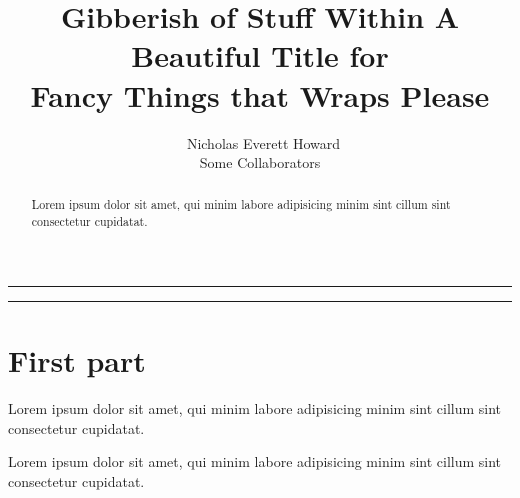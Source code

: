 






\settings
{}

\title{Gibberish of Stuff Within A Beautiful Title for\\
Fancy Things that Wraps Please}
\author{\Large{\ Nicholas Everett Howard}
\smallskip\\
Some Collaborators
}
\date{}
\maketitle

\thispagestyle{titlepage}

\vspace{4mm}
\hrule
\vspace{4mm}
\begin{abstract}
\normalsize
Lorem ipsum dolor sit amet, qui minim labore adipisicing minim sint cillum sint
consectetur cupidatat.
\end{abstract}

\vspace{4mm}
\hrule
\vspace{4mm}

\tableofcontents
\settings
\newpage


\section{First part}
Lorem ipsum dolor sit amet, qui minim labore adipisicing minim sint cillum sint
consectetur cupidatat.



Lorem ipsum dolor sit amet, qui minim labore adipisicing minim sint cillum sint
consectetur cupidatat.


